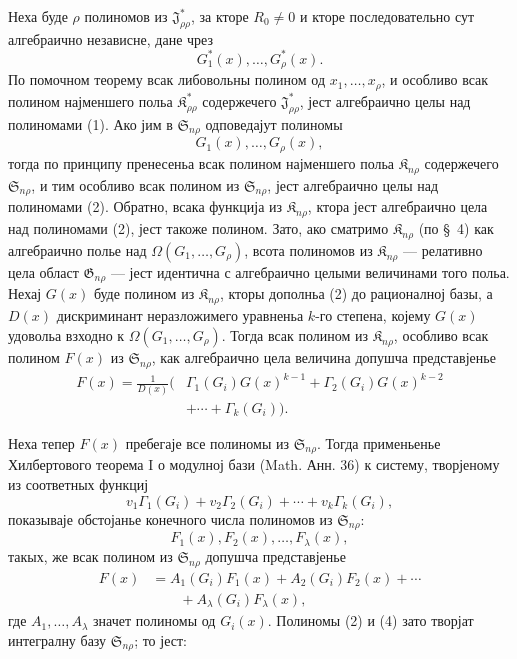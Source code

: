 ﻿\documentclass[11pt]{article}
\providecommand{\Kfield}{\mathfrak{K}}
\providecommand{\Ssys}{\mathfrak{S}}
\providecommand{\Jdom}{\mathfrak{J}}
\providecommand{\Gdom}{\mathfrak{G}}
\begin{document}
Неха буде $\rho$ полиномов из $\Jdom^*_{\rho\rho}$, за кторе $R_0\ne0$ и кторе последовательно сут алгебраично независне, дане чрез
\begin{equation}
  G_1^*(x),\ldots,G_\rho^*(x).
\tag{1}
\end{equation}
По помочном теорему всак либовольны полином од $x_1,\ldots,x_\rho$, и особливо всак полином најменшего польа $\Kfield^*_{\rho\rho}$ содержечего $\Jdom^*_{\rho\rho}$, јест алгебраично целы над полиномами (1). Ако јим в $\Ssys_{n\rho}$ одповедајут полиномы
\begin{equation}
  G_1(x),\ldots,G_\rho(x),
\tag{2}
\end{equation}
тогда по принципу пренесеньа всак полином најменшего польа $\Kfield_{n\rho}$ содержечего $\Ssys_{n\rho}$, и тим особливо всак полином из $\Ssys_{n\rho}$, јест алгебраично целы над полиномами (2). Обратно, всака функција из $\Kfield_{n\rho}$, ктора јест алгебраично цела над полиномами (2), јест такоже полином. Зато, ако сматримо $\Kfield_{n\rho}$ (по \S\ 4) как алгебраично полье над $\Omega(G_1,\ldots,G_\rho)$, всота полиномов из $\Kfield_{n\rho}$ --- релативно цела област $\Gdom_{n\rho}$ --- јест идентична с алгебраично целыми величинами того польа. Нехај $G(x)$ буде полином из $\Kfield_{n\rho}$, кторы дополньа (2) до рационалној базы, а $D(x)$ дискриминант неразложимего уравненьа $k$-го степена, којему $G(x)$ удовольа взходно к $\Omega(G_1,\ldots,G_\rho)$. Тогда всак полином из $\Kfield_{n\rho}$, особливо всак полином $F(x)$ из $\Ssys_{n\rho}$, как алгебраично цела величина допушча представјенье
\begin{equation}
\begin{split}
  F(x)=\frac{1}{D(x)}\big(&\Gamma_1(G_i)G(x)^{k-1}
    +\Gamma_2(G_i)G(x)^{k-2}\\
    &+\cdots+\Gamma_k(G_i)\big).
\end{split}
\tag{3}
\end{equation}

Неха тепер $F(x)$ пребегаје все полиномы из $\Ssys_{n\rho}$. Тогда применьенье Хилбертового теорема I о модулној бази (Math. Анн. 36) к систему, творјеному из соответных функциј
\[
  v_1\Gamma_1(G_i)+v_2\Gamma_2(G_i)+\cdots+v_k\Gamma_k(G_i),
\]
показываје обстојанье конечного числа полиномов из $\Ssys_{n\rho}$:
\begin{equation}
  F_1(x),F_2(x),\ldots,F_\lambda(x),
\tag{4}
\end{equation}
такых, же всак полином из $\Ssys_{n\rho}$ допушча представјенье
\begin{equation}
\begin{aligned}
  F(x)&=A_1(G_i)F_1(x)+A_2(G_i)F_2(x)+\cdots\\
      &\qquad +A_\lambda(G_i)F_\lambda(x),
\end{aligned}
\tag{5}
\end{equation}
где $A_1,\ldots,A_\lambda$ значет полиномы од $G_i(x)$. Полиномы (2) и (4) зато творјат интегралну базу $\Ssys_{n\rho}$; то јест:
\end{document}
